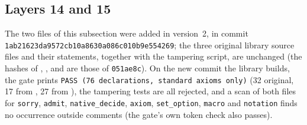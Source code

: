 \documentclass[11pt]{article}
\theoremstyle{definition}
\theoremstyle{remark}
\newcommand{\lean}[1]{\texttt{#1}}
\newcommand{\shortcommit}{051ae8c}
\begin{document}
\subsection{Layers 14 and 15}\label{sec:l1415}

The two files of this subsection were added in version~2, in commit \texttt{1ab21623da9572cb10a8630a086c010b9e554269}; the three
original library source files and their statements, together with the tampering script, are unchanged (the hashes of , ,
 and  are those of \texttt{\shortcommit}). On the new commit
the library builds, the gate prints \texttt{PASS (76 declarations, standard axioms only)} (32
original, 17 from , 27 from ), the tampering tests are all
rejected, and a scan of both files for \lean{sorry}, \lean{admit}, \lean{native\_decide},
\lean{axiom}, \lean{set\_option}, \lean{macro} and \lean{notation} finds no occurrence outside
comments (the gate's own token check also passes).
\end{document}
